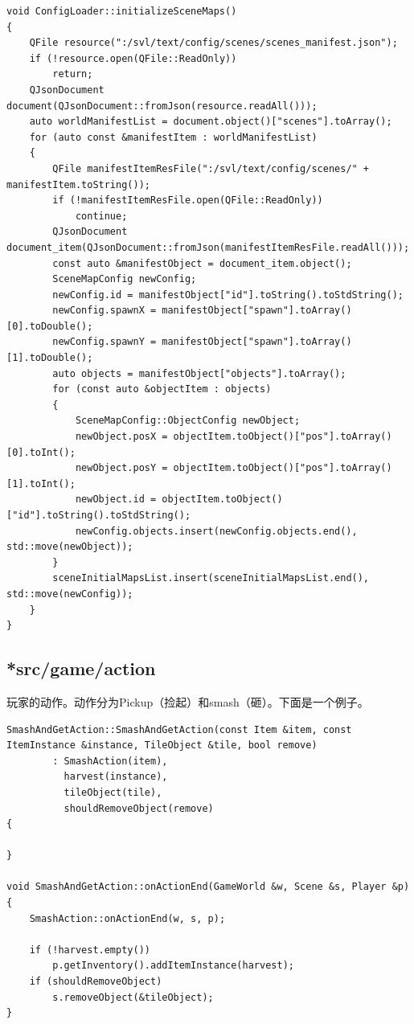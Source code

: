\documentclass[a4paper,12pt]{report}
\begin{document}
\begin{spacing}{1.5}
\begin{lstlisting}
void ConfigLoader::initializeSceneMaps()
{
    QFile resource(":/svl/text/config/scenes/scenes_manifest.json");
    if (!resource.open(QFile::ReadOnly))
        return;
    QJsonDocument document(QJsonDocument::fromJson(resource.readAll()));
    auto worldManifestList = document.object()["scenes"].toArray();
    for (auto const &manifestItem : worldManifestList)
    {
        QFile manifestItemResFile(":/svl/text/config/scenes/" + manifestItem.toString());
        if (!manifestItemResFile.open(QFile::ReadOnly))
            continue;
        QJsonDocument document_item(QJsonDocument::fromJson(manifestItemResFile.readAll()));
        const auto &manifestObject = document_item.object();
        SceneMapConfig newConfig;
        newConfig.id = manifestObject["id"].toString().toStdString();
        newConfig.spawnX = manifestObject["spawn"].toArray()[0].toDouble();
        newConfig.spawnY = manifestObject["spawn"].toArray()[1].toDouble();
        auto objects = manifestObject["objects"].toArray();
        for (const auto &objectItem : objects)
        {
            SceneMapConfig::ObjectConfig newObject;
            newObject.posX = objectItem.toObject()["pos"].toArray()[0].toInt();
            newObject.posY = objectItem.toObject()["pos"].toArray()[1].toInt();
            newObject.id = objectItem.toObject()["id"].toString().toStdString();
            newConfig.objects.insert(newConfig.objects.end(), std::move(newObject));
        }
        sceneInitialMapsList.insert(sceneInitialMapsList.end(), std::move(newConfig));
    }
}
\end{lstlisting}
\subsection{\textbf{*src/game/action}}
玩家的动作。动作分为Pickup（捡起）和smash（砸）。下面是一个例子。\\
\begin{lstlisting}
SmashAndGetAction::SmashAndGetAction(const Item &item, const ItemInstance &instance, TileObject &tile, bool remove)
        : SmashAction(item),
          harvest(instance),
          tileObject(tile),
          shouldRemoveObject(remove)
{

}

void SmashAndGetAction::onActionEnd(GameWorld &w, Scene &s, Player &p)
{
    SmashAction::onActionEnd(w, s, p);

    if (!harvest.empty())
        p.getInventory().addItemInstance(harvest);
    if (shouldRemoveObject)
        s.removeObject(&tileObject);
}
\end{lstlisting}
\end{spacing}
\end{document}
